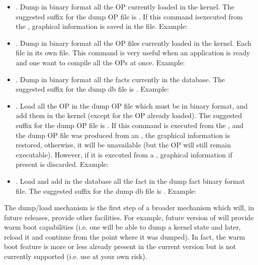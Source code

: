 \begin{itemize}

\item {}.  Dump in binary format all the OP
currently loaded in the kernel. The suggested suffix for the dump OP file is
. If this command isexecuted from the \XPK{}, graphical information
is saved in the file.\* 
Example: 

\item {}.  Dump in binary format all the OP files
currently loaded in the kernel. Each file in its own  file. This 
command is very useful when an application is ready and one want to compile
all the OPs at once.\* 
Example: 

\item {}.  Dump in binary format all the facts
currently in the database. The suggested suffix for the dump db file is
.\* 
Example: 

\item {}.  Load all the OP in the dump OP
file which must be in binary format, and add them in the kernel (except for the
OP already loaded). The suggested suffix for the dump OP file is .
If this command is executed from the \XPK{}, and the dump OP file was produced
from an \XPK{}, the graphical information is restored, otherwise, it will be
unavailable (but the OP will still remain executable).  However, if it is
executed from a \CPK{}, graphical information if present is discarded. \*
Example: 

\item {}.  Load and add in the database all
the fact in the dump fact binary format file. The suggested suffix for the dump
db file is .\* 
Example: 

\end{itemize}

The dump/load mechanism is the first step of a broader mechanism which will, in
future releases, provide other facilities. For example, future version of
\COPRS{} will provide warm boot capabilities (i.e. one will be able to dump a
kernel state and later, reload it and continue from the point where it was
dumped). In fact, the warm boot feature is more or less already present in the
current version but is not currently supported (i.e. use at your own risk).

